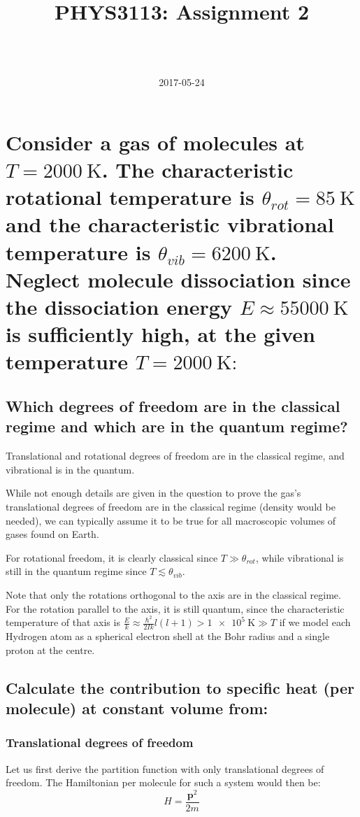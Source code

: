 \documentclass[a4paper]{scrartcl}
\begin{document}
\title{PHYS3113: Assignment 2}
\author{ \\ \\ }
\date{2017-05-24}
\maketitle

\section{Consider a gas of  molecules at \(T = \SI{2000}{\kelvin}\). The characteristic rotational temperature is \(\theta_{rot} = \SI{85}{\kelvin}\) and the characteristic vibrational temperature is \(\theta_{vib} = \SI{6200}{\kelvin}\). Neglect molecule dissociation since the dissociation energy \(E \approx \SI{55000}{\kelvin}\) is sufficiently high, at the given temperature \(T = \SI{2000}{\kelvin}:\)}
\subsection{Which degrees of freedom are in the classical regime and which are in the quantum regime?}
Translational and rotational degrees of freedom are in the classical regime, and vibrational is in the quantum.

While not enough details are given in the question to prove the gas's translational degrees of freedom are in the classical regime (density would be needed), we can typically assume it to be true for all macroscopic volumes of gases found on Earth.

For rotational freedom, it is clearly classical since \(T \gg \theta_{rot}\), while vibrational is still in the quantum regime since \(T \lesssim \theta_{vib}\).

Note that only the rotations orthogonal to the  axis are in the classical regime. For the rotation parallel to the axis, it is still quantum, since the characteristic temperature of that axis is \(\frac{E}{k} \approx \frac{\hbar^2}{2 I k} l (l + 1) > \SI{1e5}{\kelvin} \gg T\) if we model each Hydrogen atom as a spherical electron shell at the Bohr radius and a single proton at the centre.

\subsection{Calculate the contribution to specific heat (per molecule) at constant volume from:}
\subsubsection{Translational degrees of freedom}
Let us first derive the partition function with only translational degrees of freedom. The Hamiltonian per molecule for such a system would then be:
\[H = \frac{\mathbf{p}^2}{2 m}\]
\end{document}
